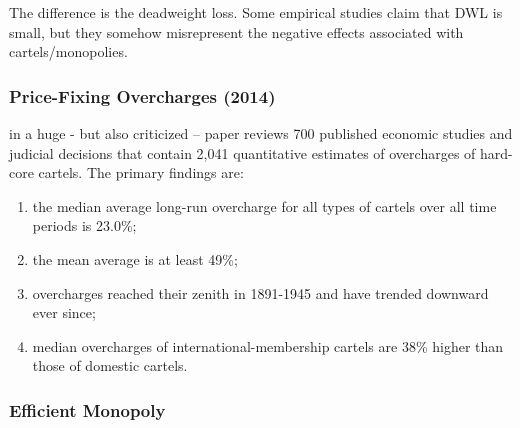         The difference is the deadweight loss. Some empirical studies claim that DWL is small, but they somehow misrepresent the negative effects associated with cartels/monopolies.

        

        \subsubsection{Price-Fixing Overcharges (2014)}

            in a huge - but also criticized – paper reviews 700 published economic studies and judicial decisions that contain 2,041 quantitative estimates of overcharges of hard-core cartels. The primary findings are: 
            \begin{enumerate}
                \item the median average long-run overcharge for all types of cartels over all time periods is 23.0\%; 
                \item the mean average is at least 49\%; 
                \item overcharges reached their zenith in 1891-1945 and have trended downward ever since; 
                \item median overcharges of international-membership cartels are 38\% higher than those of domestic cartels.
            \end{enumerate}

        \subsubsection{Efficient Monopoly}

